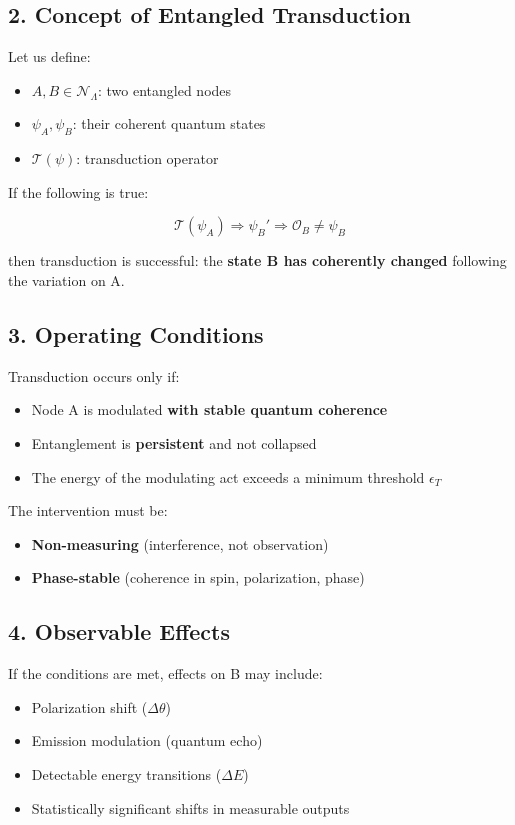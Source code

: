 \documentclass[12pt]{article}
\begin{document}
\subsection*{2. Concept of Entangled Transduction}

Let us define:
\begin{itemize}
    \item $A, B \in \mathcal{N}_\Lambda$: two entangled nodes
    \item $\psi_A, \psi_B$: their coherent quantum states
    \item $\mathcal{T}(\psi)$: transduction operator
\end{itemize}

If the following is true:

\[
\mathcal{T}(\psi_A) \Rightarrow \psi_B' \Rightarrow \mathcal{O}_B \neq \psi_B
\]

then transduction is successful: the \textbf{state B has coherently changed} following the variation on A.

\subsection*{3. Operating Conditions}

Transduction occurs only if:
\begin{itemize}
    \item Node A is modulated \textbf{with stable quantum coherence}
    \item Entanglement is \textbf{persistent} and not collapsed
    \item The energy of the modulating act exceeds a minimum threshold $\epsilon_T$
\end{itemize}

The intervention must be:
\begin{itemize}
    \item \textbf{Non-measuring} (interference, not observation)
    \item \textbf{Phase-stable} (coherence in spin, polarization, phase)
\end{itemize}

\subsection*{4. Observable Effects}

If the conditions are met, effects on B may include:
\begin{itemize}
    \item Polarization shift ($\Delta \theta$)
    \item Emission modulation (quantum echo)
    \item Detectable energy transitions ($\Delta E$)
    \item Statistically significant shifts in measurable outputs
\end{itemize}
\end{document}
